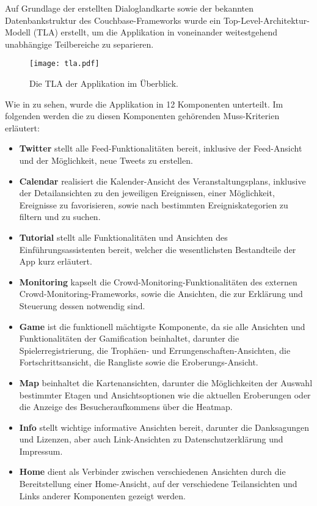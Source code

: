 Auf Grundlage der erstellten Dialoglandkarte sowie der bekannten Datenbankstruktur des Couchbase-Frameworks wurde ein Top-Level-Architektur-Modell (TLA) erstellt, um die Applikation in voneinander weitestgehend unabhängige Teilbereiche zu separieren.

\begin{figure}[H]
\texttt{[image: tla.pdf]}
\caption{Die TLA der Applikation im Überblick.}\label{fig:tla}
\end{figure}

\noindent Wie in  zu sehen, wurde die Applikation in 12 Komponenten unterteilt. Im folgenden werden die zu diesen Komponenten gehörenden Muss-Kriterien erläutert:

\begin{itemize}
    \item \textbf{Twitter} stellt alle Feed-Funktionalitäten bereit, inklusive der Feed-Ansicht und der Möglichkeit, neue Tweets zu erstellen.
    \item \textbf{Calendar} realisiert die Kalender-Ansicht des Veranstaltungsplans, inklusive der Detailansichten zu den jeweiligen Ereignissen, einer Möglichkeit, Ereignisse zu favorisieren, sowie nach bestimmten Ereigniskategorien zu filtern und zu suchen.
    \item \textbf{Tutorial} stellt alle Funktionalitäten und Ansichten des Einführungsassistenten bereit, welcher die wesentlichsten Bestandteile der App kurz erläutert.
    \item \textbf{Monitoring} kapselt die Crowd-Monitoring-Funktionalitäten des externen Crowd-Monitoring-Frameworks, sowie die Ansichten, die zur Erklärung und Steuerung dessen notwendig sind.
    \item \textbf{Game} ist die funktionell mächtigste Komponente, da sie alle Ansichten und Funktionalitäten der Gamification beinhaltet, darunter die Spielerregistrierung, die Trophäen- und Errungenschaften-Ansichten, die Fortschrittsansicht, die Rangliste sowie die Eroberungs-Ansicht.
    \item \textbf{Map} beinhaltet die Kartenansichten, darunter die Möglichkeiten der Auswahl bestimmter Etagen und Ansichtsoptionen wie die aktuellen Eroberungen oder die Anzeige des Besucheraufkommens über die Heatmap.
    \item \textbf{Info} stellt wichtige informative Ansichten bereit, darunter die Danksagungen und Lizenzen, aber auch Link-Ansichten zu Datenschutzerklärung und Impressum.
    \item \textbf{Home} dient als Verbinder zwischen verschiedenen Ansichten durch die Bereitstellung einer Home-Ansicht, auf der verschiedene Teilansichten und Links anderer Komponenten gezeigt werden.

\end{itemize}

